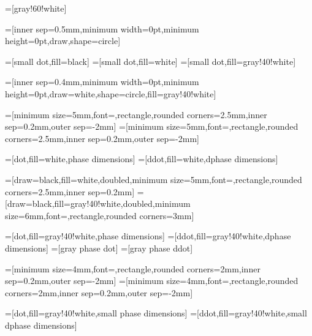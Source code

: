=[gray!60!white]


=[inner sep=0.5mm,minimum width=0pt,minimum height=0pt,draw,shape=circle]

=[small dot,fill=black]
=[small dot,fill=white]
=[small dot,fill=gray!40!white]

=[inner sep=0.4mm,minimum width=0pt,minimum height=0pt,draw=white,shape=circle,fill=gray!40!white]


=[minimum size=5mm,font=\footnotesize,rectangle,rounded corners=2.5mm,inner sep=0.2mm,outer sep=-2mm]
=[minimum size=5mm,font=\footnotesize,rectangle,rounded corners=2.5mm,inner sep=0.2mm,outer sep=-2mm]

=[dot,fill=white,phase dimensions]
=[ddot,fill=white,dphase dimensions]

=[draw=black,fill=white,doubled,minimum size=5mm,font=\footnotesize,rectangle,rounded corners=2.5mm,inner sep=0.2mm]
=[draw=black,fill=gray!40!white,doubled,minimum size=6mm,font=\footnotesize,rectangle,rounded corners=3mm]

=[dot,fill=gray!40!white,phase dimensions]
=[ddot,fill=gray!40!white,dphase dimensions]
=[gray phase dot]
=[gray phase ddot]

=[minimum size=4mm,font=\tiny,rectangle,rounded corners=2mm,inner sep=0.2mm,outer sep=-2mm]
=[minimum size=4mm,font=\tiny,rectangle,rounded corners=2mm,inner sep=0.2mm,outer sep=-2mm]

=[dot,fill=gray!40!white,small phase dimensions]
=[ddot,fill=gray!40!white,small dphase dimensions]